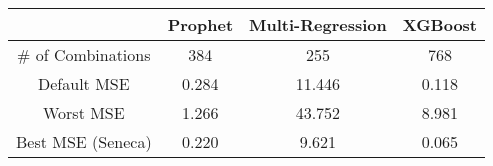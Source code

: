 \begin{tabular}{|c|c|c|c|}
\hline
& \textbf{Prophet} & \textbf{Multi-Regression} & \textbf{XGBoost}\\
\hline
\# of Combinations & 384 & 255 & 768\\
\hline
\hline
Default MSE & 0.284 & 11.446 & 0.118 \\
\hline
Worst MSE & 1.266 & 43.752 & 8.981 \\
\hline
Best MSE (Seneca) & 0.220 & 9.621 & 0.065 \\
\hline
\end{tabular}
